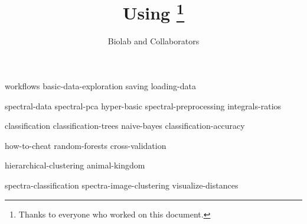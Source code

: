 \documentclass[symmetric, justified, a4paper]{tufte-book}
\title{Using \mutation\thanks{Thanks to everyone who worked on this document.}}
\author[Biolab and Collaborators]{Biolab and Collaborators}
\begin{document}
\frontmatter

\maketitle



\tableofcontents

%

\mainmatter



{workflows}
{basic-data-exploration}
{saving}
{loading-data}

{spectral-data}
{spectral-pca}
{hyper-basic}
{spectral-preprocessing}
{integrals-ratios}

{classification}
{classification-trees}
{naive-bayes}
{classification-accuracy}

{how-to-cheat}
{random-forests}
{cross-validation}

{hierarchical-clustering}
{animal-kingdom}

{spectra-classification}
{spectra-image-clustering}
{visualize-distances}


\backmatter





\printindex
\end{document}
